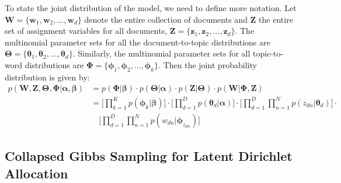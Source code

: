 To state the joint distribution of the model, we need to define more notation. Let $\boldsymbol{W}=\{\boldsymbol{w}_1, \boldsymbol{w}_2, ..., \boldsymbol{w}_d\}$ denote the entire collection of documents and $\boldsymbol{Z}$ the entire set of assignment variables for all documents, $\boldsymbol{Z} = \{\boldsymbol{z}_1, \boldsymbol{z}_2, ..., \boldsymbol{z}_d\}$. The multinomial parameter sets for all the document-to-topic distributions are $\boldsymbol{\Theta}=\{\boldsymbol{\theta}_{1}, \boldsymbol{\theta}_{2}, ..., \boldsymbol{\theta}_{d}\}$. Similarly, the multinomial parameter sets for all topic-to-word distributions are $\boldsymbol{\Phi}=\{\boldsymbol{\phi}_1, \boldsymbol{\phi}_2, ..., \boldsymbol{\phi}_k\}$. Then the joint probability distribution is given by:
\begin{equation}
\begin{aligned}
p(\boldsymbol{W}, \boldsymbol{Z}, \boldsymbol{\Theta}, \boldsymbol{\Phi} \vert \boldsymbol{\alpha}, \boldsymbol{\beta}) &= p(\boldsymbol{\Phi} \vert \boldsymbol{\beta}) \cdot p(\boldsymbol{\Theta} \vert \boldsymbol{\alpha}) \cdot p(\boldsymbol{Z} \vert \boldsymbol{\Theta}) \cdot  p(\boldsymbol{W} \vert \boldsymbol{\Phi}, \boldsymbol{Z}) \\
                                                                                                                                                                                          &= \Bigg[\prod_{k=1}^{K} p(\boldsymbol{\phi}_k \vert \boldsymbol{\beta})\Bigg] \cdot \Bigg[\prod_{d=1}^{D} p(\boldsymbol{\theta}_d \vert \boldsymbol{\alpha})\Bigg] \cdot \Bigg[\prod_{d=1}^{D} \prod_{n=1}^{N} p(z_{dn} \vert \boldsymbol{\theta}_d)\Bigg] \cdot \\
                                                                                                                                                                                           &\quad \Bigg[\prod_{d=1}^{D} \prod_{n=1}^{N} p(w_{dn} \vert \boldsymbol{\phi}_{z_{dn}})\Bigg]
\end{aligned}
\label{eq:background-lda-full-joint}
\end{equation}

\subsection{Collapsed Gibbs Sampling for Latent Dirichlet Allocation}


